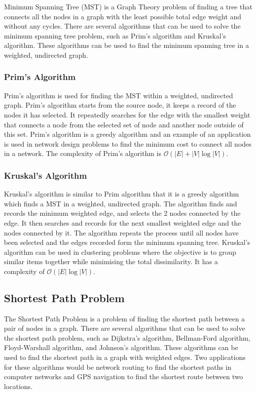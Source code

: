 Minimum Spanning Tree (MST) is a Graph Theory problem of finding a tree that connects all the nodes in a graph with the least possible total edge weight and without any cycles. There are several algorithms that can be used to solve the minimum spanning tree problem, such as Prim's algorithm and Kruskal's algorithm. These algorithms can be used to find the minimum spanning tree in a weighted, undirected graph.

\subsubsection{Prim's Algorithm}

Prim's algorithm is used for finding the MST within a weighted, undirected graph. Prim's algorithm starts from the source node, it keeps a record of the nodes it has selected. It repeatedly searches for the edge with the smallest weight that connects a node from the selected set of node and another node outside of this set. Prim's algorithm is a greedy algorithm and an example of an application is used in network design problems to find the minimum cost to connect all nodes in a network. The complexity of Prim's algorithm is $\mathcal{O}(|E|+|V|\log |V|)$.

\subsubsection{Kruskal's Algorithm}

Kruskal's algorithm is similar to Prim algorithm that it is a greedy algorithm which finds a MST in a weighted, undirected graph. The algorithm finds and records the minimum weighted edge, and selects the 2 nodes connected by the edge. It then searches and records for the next smallest weighted edge and the nodes connected by it. The algorithm repeats the process until all nodes have been selected and the edges recorded form the minimum spanning tree. Kruskal's algorithm can be used in clustering problems where the objective is to group similar items together while minimising the total dissimilarity. It has a complexity of $\mathcal{O}(|E|\log |V|)$.

\subsection{Shortest Path Problem}

The Shortest Path Problem is a problem of finding the shortest path between a pair of nodes in a graph. There are several algorithms that can be used to solve the shortest path problem, such as Dijkstra's algorithm, Bellman-Ford algorithm, Floyd-Warshall algorithm, and Johnson's algorithm. These algorithms can be used to find the shortest path in a graph with weighted edges. Two applications for these algorithms would be network routing to find the shortest paths in computer networks and GPS navigation to find the shortest route between two locations.


